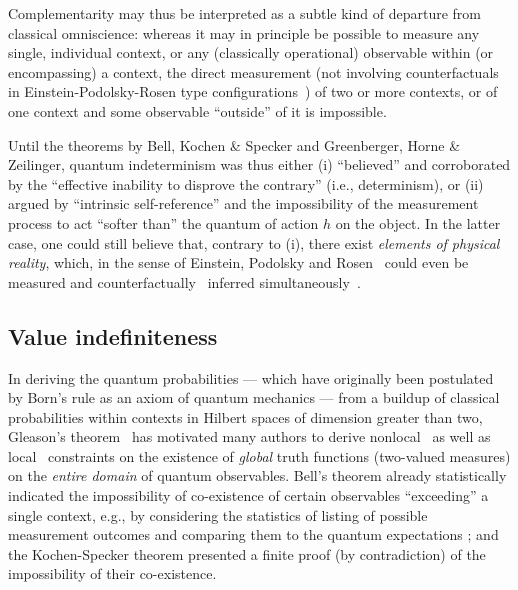 \documentclass[10pt]{article}%
\begin{document}
Complementarity may thus be interpreted as a subtle kind of departure from
classical omniscience:
whereas it may in principle be possible to measure any single, individual context,
or any (classically operational) observable within (or encompassing) a context,
the direct measurement
(not involving counterfactuals in Einstein-Podolsky-Rosen type configurations~\cite{epr,svozil-2006-omni})
of two or more contexts, or of one context and some observable ``outside'' of it
is impossible.

Until the theorems by Bell, Kochen \& Specker and Greenberger, Horne \& Zeilinger, quantum indeterminism was thus either
(i) ``believed'' and corroborated by the ``effective inability to disprove the contrary'' (i.e., determinism), or
(ii) argued by ``intrinsic self-reference'' and the impossibility of the measurement process
 to act ``softer than'' the quantum of action $h$ on the object.
In the latter case, one could still believe that, contrary to (i), there exist {\em elements of physical reality}, which,
in the sense of Einstein, Podolsky and Rosen~\cite{epr} could even be  measured and
counterfactually~\cite{svozil-2006-omni} inferred simultaneously~\cite{svozil-2006-uniquenessprinciple}.


\subsection{Value indefiniteness}

In deriving the quantum probabilities
---
which have originally been postulated by Born's rule as an axiom of quantum mechanics
---
from a buildup of classical probabilities within contexts in Hilbert spaces of dimension greater than two,
Gleason's theorem~\cite{Gleason,pitowsky:218,rich-bridge,r:dvur-93}
has motivated many authors to derive
nonlocal~\cite{bell,peres222,hey-red,ghz,mermin-93,zeilinger-epr-98}
as well as local~\cite{specker-60,kochen1,ZirlSchl-65,Alda,Alda2,kamber64,kamber65,peres-91,svozil-tkadlec,cabello-96,cabello:210401}
constraints on the existence of {\em global} truth functions (two-valued measures)
on the {\em entire domain} of quantum observables.
Bell's theorem already statistically indicated the
impossibility of co-existence of certain observables
``exceeding'' a single context, e.g.,
by considering the statistics of listing of possible measurement outcomes
and comparing them to the quantum expectations
\cite{peres222}; and the
Kochen-Specker theorem presented a finite proof (by contradiction)
of the impossibility of their co-existence.
\end{document}
